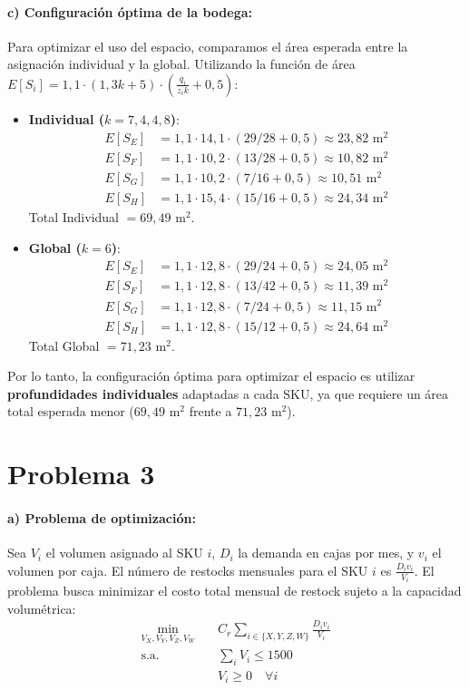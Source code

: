 \documentclass[11pt]{article}
\begin{document}
\paragraph{c) Configuración óptima de la bodega:}
Para optimizar el uso del espacio, comparamos el área esperada entre la asignación individual y la global.
Utilizando la función de área $ E[S_i] = 1,1 \cdot (1,3 k + 5) \cdot \left( \frac{q_i}{z_i k} + 0,5 \right) $:
\begin{itemize}
    \item \textbf{Individual ($k = 7, 4, 4, 8$)}:
    \begin{align*}
        E[S_E] &= 1,1 \cdot 14,1 \cdot (29/28 + 0,5) \approx 23,82 \text{ m}^2 \\
        E[S_F] &= 1,1 \cdot 10,2 \cdot (13/28 + 0,5) \approx 10,82 \text{ m}^2 \\
        E[S_G] &= 1,1 \cdot 10,2 \cdot (7/16 + 0,5) \approx 10,51 \text{ m}^2 \\
        E[S_H] &= 1,1 \cdot 15,4 \cdot (15/16 + 0,5) \approx 24,34 \text{ m}^2 
    \end{align*}
    Total Individual $= 69,49 \text{ m}^2$.

    \item \textbf{Global ($k = 6$)}:
    \begin{align*}
        E[S_E] &= 1,1 \cdot 12,8 \cdot (29/24 + 0,5) \approx 24,05 \text{ m}^2 \\
        E[S_F] &= 1,1 \cdot 12,8 \cdot (13/42 + 0,5) \approx 11,39 \text{ m}^2 \\
        E[S_G] &= 1,1 \cdot 12,8 \cdot (7/24 + 0,5) \approx 11,15 \text{ m}^2 \\
        E[S_H] &= 1,1 \cdot 12,8 \cdot (15/12 + 0,5) \approx 24,64 \text{ m}^2 
    \end{align*}
    Total Global $= 71,23 \text{ m}^2$.
\end{itemize}
Por lo tanto, la configuración óptima para optimizar el espacio es utilizar \textbf{profundidades individuales} adaptadas a cada SKU, ya que requiere un área total esperada menor ($69,49 \text{ m}^2$ frente a $71,23 \text{ m}^2$).


\section*{Problema 3}

\paragraph{a) Problema de optimización:}
Sea $V_i$ el volumen asignado al SKU $i$, $D_i$ la demanda en cajas por mes, y $v_i$ el volumen por caja.
El número de restocks mensuales para el SKU $i$ es $\frac{D_i v_i}{V_i}$. 
El problema busca minimizar el costo total mensual de restock sujeto a la capacidad volumétrica:
\begin{align*}
    \min_{V_X, V_Y, V_Z, V_W} \quad & C_r \sum_{i \in \{X,Y,Z,W\}} \frac{D_i v_i}{V_i} \\
    \text{s.a.} \quad & \sum_{i} V_i \le 1500 \\
    & V_i \ge 0 \quad \forall i
\end{align*}
\end{document}
